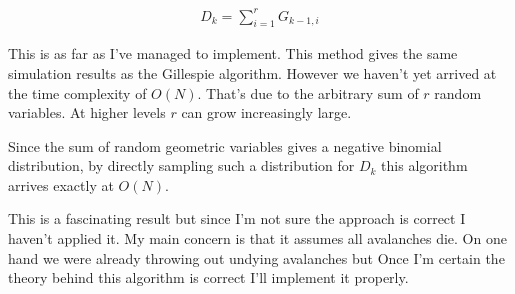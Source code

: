 \documentclass{article}
\begin{document}
\begin{gather}
D_k = \sum_{i=1}^r G_{k-1,i}
\end{gather}

This is as far as I've managed to implement. This method gives the same
simulation results as the Gillespie algorithm. However we haven't yet
arrived at the time complexity of \(O(N)\). That's due to the arbitrary
sum of \(r\) random variables. At higher levels \(r\) can grow
increasingly large.

Since the sum of random geometric variables gives a negative binomial
distribution, by directly sampling such a distribution for \(D_k\) this
algorithm arrives exactly at \(O(N)\).

This is a fascinating result but since I'm not sure the approach is
correct I haven't applied it. My main concern is that it assumes all
avalanches die. On one hand we were already throwing out undying
avalanches but Once I'm certain the theory behind this algorithm is
correct I'll implement it properly.
\end{document}
